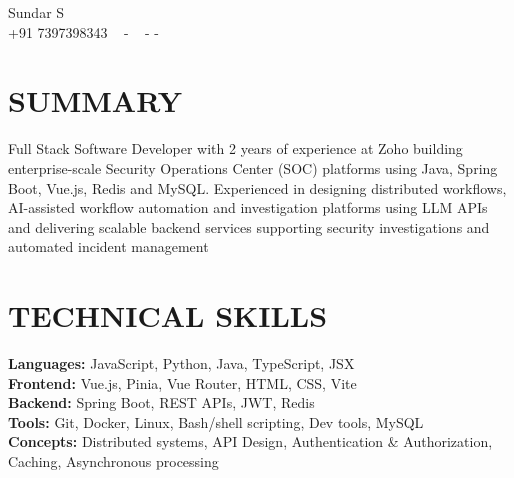 \documentclass[letterpaper,11pt]{article}
\begin{document}

\vspace{-20px}
\begin{center}
    {\huge Sundar S} \\ \vspace{2pt} 
    {+91 7397398343} ~ 
    \small{-}
    \href{mailto:[sundarselvam3@gmail.com]}{\color{blue}{sundarselvam3@gmail.com}} ~ 
    \small{-}
    \href{https://www.linkedin.com/in/sundar-s-870042235/}{ \color{blue}{LinkedIn}}
    \small{-}
    \href{https://github.com/Sundar0603}{ \color{blue}{GitHub}} ~
    \vspace{-7pt}
\end{center}


\section{\color{airforceblue}SUMMARY} 
Full Stack Software Developer with 2 years of experience at Zoho building enterprise-scale Security Operations Center (SOC) platforms using Java, Spring Boot, Vue.js, Redis and MySQL. Experienced in designing distributed workflows, AI-assisted workflow automation and investigation platforms using LLM APIs and delivering scalable backend services supporting security investigations and automated incident management
\vspace{-10pt}



\section{\color{airforceblue}TECHNICAL SKILLS}
 \begin{itemize}[leftmargin=0in, label={}]
    \small{\item{
     \textbf{\normalsize{Languages:}}{ \normalsize{JavaScript, Python, Java, TypeScript, JSX}} \\
      \textbf{\normalsize{Frontend:}}{ \normalsize{Vue.js, Pinia, Vue Router, HTML, CSS, Vite}} \\
      \textbf{\normalsize{Backend:}}{ \normalsize{Spring Boot, REST APIs, JWT, Redis}} \\
      \textbf{\normalsize{Tools:}}{ \normalsize{Git, Docker, Linux, Bash/shell scripting, Dev tools, MySQL}} \\
      \textbf{\normalsize{Concepts:}}{ \normalsize{Distributed systems, API Design, Authentication \& Authorization, Caching, Asynchronous processing}} \\

     }}
 \end{itemize}
 \vspace{-18pt}
 
\end{document}
